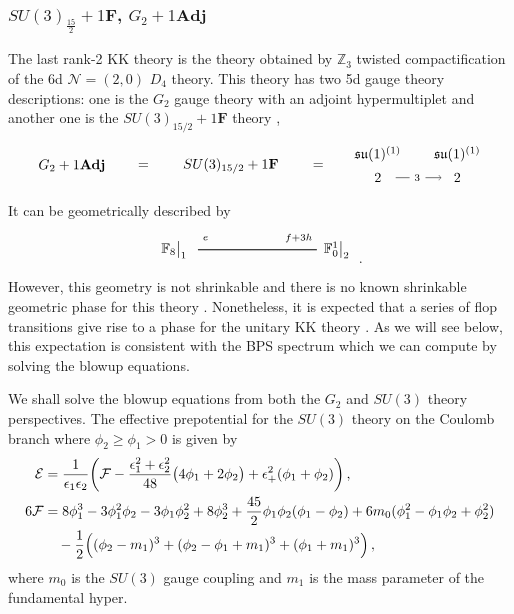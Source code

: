 \subsubsection{\texorpdfstring{$SU(3)_{\frac{15}{2}}+1\mathbf{F}$, $G_2+1\mathbf{Adj}$}{G2 + 1Adj}}

The last rank-2 KK theory is the theory obtained by $ \mathbb{Z}_3 $ twisted compactification of the 6d $\mathcal{N}=(2,0)$ $ D_4$ theory. This theory has two 5d gauge theory descriptions: one is the $G_2$ gauge theory with an adjoint hypermultiplet \cite{Tachikawa:2011ch} and another one is the $ SU(3)_{15/2} + 1\mathbf{F} $ theory \cite{Bhardwaj:2019jtr},
\begin{align}
\begin{tikzpicture}
\draw (0, 0) node {$ G_2 + 1\mathbf{Adj} $}
(1.8, 0) node {$ = $}
(4, 0) node {$ SU(3)_{15/2} + 1\mathbf{F} $}
(6.2, 0) node {$ = $}
(7.7, 0.3) node {$ \mathfrak{su}(1)^{(1)} $}
(7.7, -0.3) node {$ 2 $}
(9.7, 0.3) node {$ \mathfrak{su}(1)^{(1)} $}
(9.7, -0.3) node {$ 2 $}
(8.15, -0.3) -- (8.5, -0.3)
(8.7, -0.3) node {$ _3 $}
;
\draw [->] (8.9, -0.3) -- (9.3, -0.3);
\end{tikzpicture}
\end{align}
It can be geometrically described by 
\begin{align}\label{eq:G2_adj_geo}
\begin{tikzpicture}
\draw[thick](-3,0)--(0,0);	
\node at(-3.6,0) {$\mathbb{F}_{8}{}\big|_1$};
\node at(-2.8,0.3) {${}_e$};
\node at(0.5,0) {$\mathbb{F}^1_{0}{}\big|_2$};
\node at(-0.45,0.3) {${}_{f+3h}$};
\end{tikzpicture} \ .
\end{align}
However, this geometry is not shrinkable and there is no known shrinkable geometric phase for this theory \cite{Jefferson:2018irk}. Nonetheless, it is expected that a series of flop transitions give rise to a phase for the unitary KK theory \cite{Bhardwaj:2019jtr}. As we will see below, this expectation is consistent with the BPS spectrum which we can compute by solving the blowup equations. 

We shall solve the blowup equations from both the $G_2$ and  $SU(3)$ theory perspectives. The effective prepotential for the $SU(3)$ theory on the Coulomb branch where $\phi_2\ge \phi_1>0$ is given by
\begin{align}
\mathcal{E} &= \frac{1}{\epsilon_1 \epsilon_2} \qty(\mathcal{F} - \frac{\epsilon_1^2 + \epsilon_2^2}{48} \big(4\phi_1 + 2\phi_2\big) + \epsilon_+^2 \qty(\phi_1 + \phi_2) ) \,, \nonumber \\
6\mathcal{F}
&= 8\phi_1^3 - 3\phi_1^2 \phi_2 - 3\phi_1 \phi_2^2 + 8\phi_2^3 + \frac{45}{2} \phi_1 \phi_2(\phi_1 - \phi_2) + 6m_0 (\phi_1^2 - \phi_1 \phi_2 + \phi_2^2) \nonumber \\
& \quad - \frac{1}{2} \Big((\phi_2 - m_1)^3 + (\phi_2 - \phi_1 + m_1)^3 + (\phi_1 + m_1)^3\Big) \,,
\end{align}
where $m_0$ is the $SU(3)$ gauge coupling and $m_1$ is the mass parameter of the fundamental hyper.

